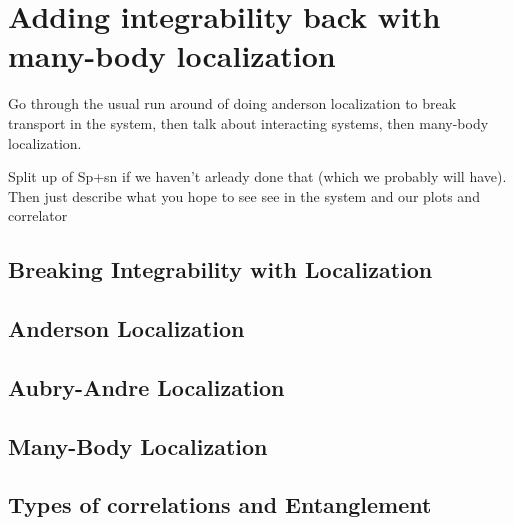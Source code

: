 
\chapter{Adding integrability back with many-body localization}

Go through the usual run around of doing anderson localization to break transport in the system, then talk about interacting systems, then many-body localization.

Split up of Sp+sn if we haven't arleady done that (which we probably will have). Then just describe what you hope to see see in the system and our plots and correlator

\section{Breaking Integrability with Localization}

\section{Anderson Localization}

\section{Aubry-Andre Localization}

\section{Many-Body Localization}

\section{Types of correlations and Entanglement}

